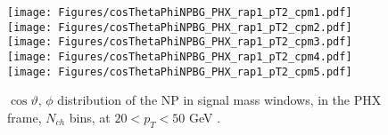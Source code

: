 \documentclass[12pt]{article}
\newcommand{\pt}{$p_{\mathrm{T}}$}
\begin{document}
\begin{figure}[htbp]
\centering
\texttt{[image: Figures/cosThetaPhiNPBG\_PHX\_rap1\_pT2\_cpm1.pdf]}
\texttt{[image: Figures/cosThetaPhiNPBG\_PHX\_rap1\_pT2\_cpm2.pdf]}
\texttt{[image: Figures/cosThetaPhiNPBG\_PHX\_rap1\_pT2\_cpm3.pdf]}
\texttt{[image: Figures/cosThetaPhiNPBG\_PHX\_rap1\_pT2\_cpm4.pdf]}
\texttt{[image: Figures/cosThetaPhiNPBG\_PHX\_rap1\_pT2\_cpm5.pdf]}
\caption{$\cos\vartheta,\,\phi$ distribution of the NP in signal mass windows, 
	in the PHX frame, $N_{ch}$ bins, at $20 < p_{T} < 50$ GeV .}
\end{figure}
\clearpage

\end{document}
